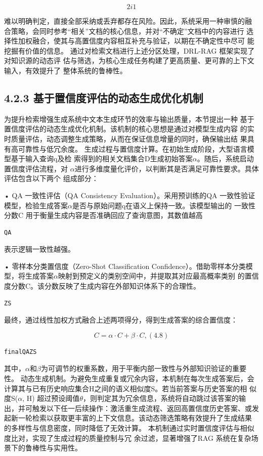 \documentclass[12pt,a4paper,openright,UTF8]{ctexbook}
\begin{document}
\begin{equation*}
2i1
\end{equation*}

难以明确判定，直接全部采纳或丢弃都存在风险。因此，系统采用一种审慎的融 合策略，会同时参考“相关”文档的核心信息，并对“不确定”文档中的内容进行 选择性加权融合，使其与高置信度内容相互补充与验证，以期在不确定性中尽可 能挖掘有价值的信息。 通过对检索文档进行上述分区处理，DRL-RAG 框架实现了对知识源的动态评 估与筛选，为核心生成任务构建了更高质量、更可靠的上下文输入，有效提升了 整体系统的鲁棒性。

\subsection{4.2.3 基于置信度评估的动态生成优化机制}

为提升检索增强生成系统中文本生成环节的效率与输出质量，本节提出一种 基于置信度评估的动态生成优化机制。该机制的核心思想是通过对模型生成内容 的实时质量评估，动态调整生成策略，从而在保证信息增量的同时，确保输出结 果具有高可靠性与低冗余度。 生成过程与置信度计算。在初始生成阶段，大型语言模型基于输入查询q及检 索得到的相关文档集合D生成初始答案$\alpha$。随后，系统启动置信度评估流程，对 $\alpha$进行多维度量化评价，以判断其是否满足可靠性要求。具体评估包含以下两个 组成部分：

• QA 一致性评估（QA Consistency Evaluation）。采用预训练的QA 一致性验证
模型，检验生成答案$\alpha$是否与原始问题q在语义上保持一致。该模型输出的 一致性分数C 用于衡量生成内容是否准确回应了查询意图，其数值越高

\begin{lstlisting}
QA
\end{lstlisting}
表示逻辑一致性越强。

• 零样本分类置信度（Zero-Shot Classification Confidence）。借助零样本分类模
型，将生成答案$\alpha$映射到预定义的类别空间中，并提取其对应最高概率类别 的置信度分数C。该分数反映了生成内容在外部知识体系下的合理性。

\begin{lstlisting}
ZS
\end{lstlisting}
最终，通过线性加权方式融合上述两项得分，得到生成答案的综合置信度：

\begin{equation*}
C = \alpha\cdot C + \beta\cdot C,(4.8)
\end{equation*}

\begin{lstlisting}
finalQAZS
\end{lstlisting}
其中，$\alpha$和$\beta$为可调节的权重系数，用于平衡内部一致性与外部知识验证的重要 性。 动态生成机制。为避免生成重复或冗余内容，本机制在每次生成答案后，会 计算其与已有历史响应集合H之间的语义相似度S。若当前答案与历史答案的相 似度S($\alpha$, H) 超过预设阈值$\theta$，则判定其为冗余信息，系统将自动跳过该答案的输 出，并可触发以下任一后续操作：激活重生成流程、返回高置信度历史答案、或发 起新一轮检索以获取更丰富的上下文信息。该动态筛选策略有效提升了生成结果 的多样性与信息密度，同时降低了无效计算。 本机制通过实时置信度评估与相似度比对，实现了生成过程的质量控制与冗 余过滤，显著增强了RAG 系统在复杂场景下的鲁棒性与实用性。
\end{document}

